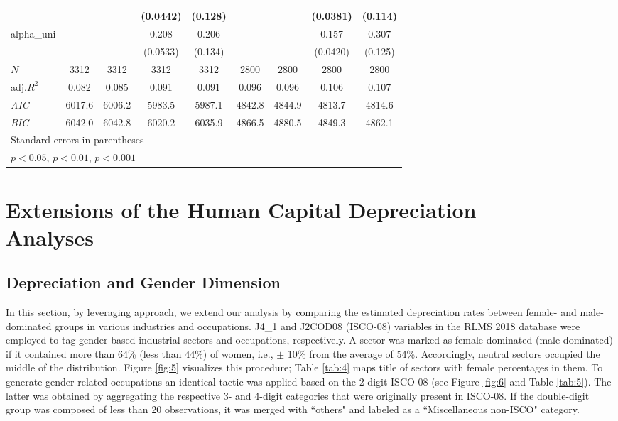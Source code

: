 \documentclass[12pt,a4paper]{article}
\numberwithin{equation}{section}
\begin{document}
\begin{table}[H]
\begin{tabular}{l*{8}{c}}
		&&&(0.0442)&(0.128)&&&(0.0381)&(0.114)\\
		\hline
		alpha\_uni&&&0.208\sym{***}&0.206&&&0.157\sym{***}&0.307\sym{*}\\
		&&&(0.0533)&(0.134)&&&(0.0420)&(0.125)\\
		\hline
		\(N\)&3312&3312&3312&3312&2800&2800&2800&2800\\
		adj.\(R^{2}\)&0.082&0.085&0.091&0.091&0.096&0.096&0.106&0.107\\
		\textit{AIC}&6017.6&6006.2&5983.5&5987.1&4842.8&4844.9&4813.7&4814.6\\
		\textit{BIC}&6042.0&6042.8&6020.2&6035.9&4866.5&4880.5&4849.3&4862.1\\
		\bottomrule
		\multicolumn{9}{l}{\footnotesize Standard errors in parentheses}\\
		\multicolumn{9}{l}{\footnotesize \sym{*} \(p<0.05\), \sym{**} \(p<0.01\), \sym{***} \(p<0.001\)}\\
	\end{tabular}
\end{table}

\section{Extensions of the Human Capital Depreciation \\ Analyses}
\subsection{Depreciation and Gender Dimension}

In this section, by leveraging  \citet{murillo_172._2006} approach, we extend our analysis by comparing the estimated depreciation rates between female- and male-dominated groups in various industries and occupations. J4\_1 and J2COD08 (ISCO-08) variables in the RLMS 2018 database were employed to tag gender-based industrial sectors and occupations, respectively. A sector was marked as female-dominated (male-dominated) if it contained more than 64\% (less than 44\%) of women, i.e., $\pm$ 10\% from the average of 54\%. Accordingly, neutral sectors occupied the middle of the distribution. Figure \ref{fig:5} visualizes this procedure; Table \ref{tab:4} maps title of sectors with female percentages in them. To generate gender-related occupations an identical tactic was applied based on the 2-digit ISCO-08 (see Figure \ref{fig:6} and Table \ref{tab:5}). The latter was obtained by aggregating the respective 3- and 4-digit categories that were originally present in ISCO-08. If the double-digit group was composed of less than 20 observations, it was merged with ``others" and labeled as a ``Miscellaneous non-ISCO" category.
\end{document}
